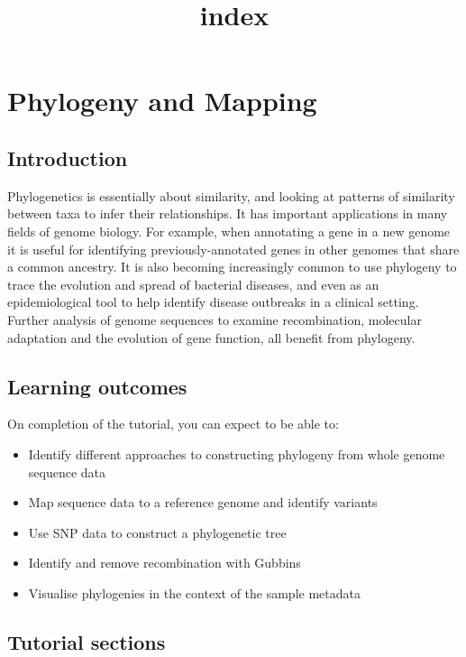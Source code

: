 \documentclass[11pt]{article}
\title{index}
\providecommand{\tightlist}{%
      \setlength{\itemsep}{0pt}\setlength{\parskip}{0pt}}
\begin{document}
    \hypertarget{phylogeny-and-mapping}{%
\section{Phylogeny and Mapping}\label{phylogeny-and-mapping}}

\hypertarget{introduction}{%
\subsection{Introduction}\label{introduction}}

Phylogenetics is essentially about similarity, and looking at patterns
of similarity between taxa to infer their relationships. It has
important applications in many fields of genome biology. For example,
when annotating a gene in a new genome it is useful for identifying
previously-annotated genes in other genomes that share a common
ancestry. It is also becoming increasingly common to use phylogeny to
trace the evolution and spread of bacterial diseases, and even as an
epidemiological tool to help identify disease outbreaks in a clinical
setting. Further analysis of genome sequences to examine recombination,
molecular adaptation and the evolution of gene function, all benefit
from phylogeny.

\hypertarget{learning-outcomes}{%
\subsection{Learning outcomes}\label{learning-outcomes}}

On completion of the tutorial, you can expect to be able to:

\begin{itemize}
\tightlist
\item
  Identify different approaches to constructing phylogeny from whole
  genome sequence data
\item
  Map sequence data to a reference genome and identify variants
\item
  Use SNP data to construct a phylogenetic tree
\item
  Identify and remove recombination with Gubbins
\item
  Visualise phylogenies in the context of the sample metadata
\end{itemize}

\hypertarget{tutorial-sections}{%
\subsection{Tutorial sections}\label{tutorial-sections}}
\end{document}
